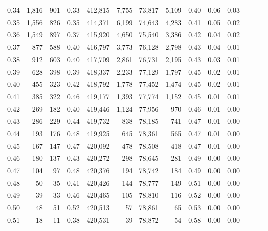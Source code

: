 \begin{tabular}{rrrrrrrrrrrrrr}
0.34 &   1,816 &    901 &  0.33 &  412,815 &    7,755 &  73,817 &   5,109 &  0.40 &  0.06 &      0.03 \\
0.35 &   1,556 &    826 &  0.35 &  414,371 &    6,199 &  74,643 &   4,283 &  0.41 &  0.05 &      0.02 \\
0.36 &   1,549 &    897 &  0.37 &  415,920 &    4,650 &  75,540 &   3,386 &  0.42 &  0.04 &      0.02 \\
0.37 &     877 &    588 &  0.40 &  416,797 &    3,773 &  76,128 &   2,798 &  0.43 &  0.04 &      0.01 \\
0.38 &     912 &    603 &  0.40 &  417,709 &    2,861 &  76,731 &   2,195 &  0.43 &  0.03 &      0.01 \\
0.39 &     628 &    398 &  0.39 &  418,337 &    2,233 &  77,129 &   1,797 &  0.45 &  0.02 &      0.01 \\
0.40 &     455 &    323 &  0.42 &  418,792 &    1,778 &  77,452 &   1,474 &  0.45 &  0.02 &      0.01 \\
0.41 &     385 &    322 &  0.46 &  419,177 &    1,393 &  77,774 &   1,152 &  0.45 &  0.01 &      0.01 \\
0.42 &     269 &    182 &  0.40 &  419,446 &    1,124 &  77,956 &     970 &  0.46 &  0.01 &      0.00 \\
0.43 &     286 &    229 &  0.44 &  419,732 &      838 &  78,185 &     741 &  0.47 &  0.01 &      0.00 \\
0.44 &     193 &    176 &  0.48 &  419,925 &      645 &  78,361 &     565 &  0.47 &  0.01 &      0.00 \\
0.45 &     167 &    147 &  0.47 &  420,092 &      478 &  78,508 &     418 &  0.47 &  0.01 &      0.00 \\
0.46 &     180 &    137 &  0.43 &  420,272 &      298 &  78,645 &     281 &  0.49 &  0.00 &      0.00 \\
0.47 &     104 &     97 &  0.48 &  420,376 &      194 &  78,742 &     184 &  0.49 &  0.00 &      0.00 \\
0.48 &      50 &     35 &  0.41 &  420,426 &      144 &  78,777 &     149 &  0.51 &  0.00 &      0.00 \\
0.49 &      39 &     33 &  0.46 &  420,465 &      105 &  78,810 &     116 &  0.52 &  0.00 &      0.00 \\
0.50 &      48 &     51 &  0.52 &  420,513 &       57 &  78,861 &      65 &  0.53 &  0.00 &      0.00 \\
0.51 &      18 &     11 &  0.38 &  420,531 &       39 &  78,872 &      54 &  0.58 &  0.00 &      0.00 \\

\end{tabular}
